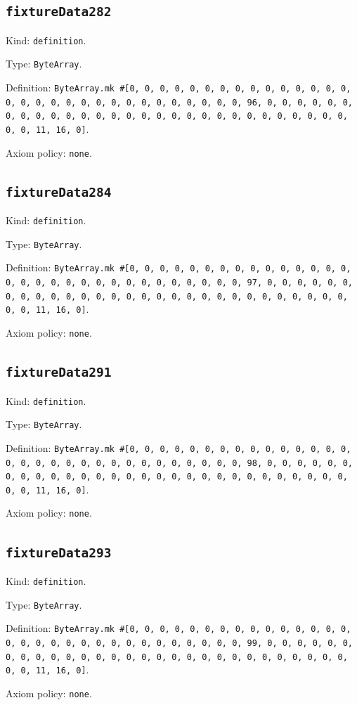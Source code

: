 \documentclass[11pt]{article}
\begin{document}
\subsection*{\texttt{fixtureData282}}
\noindent Kind: \texttt{definition}.\par
\noindent Type: \texttt{ByteArray}.\par
\noindent Definition: \texttt{ByteArray.mk \#[0, 0, 0, 0, 0, 0, 0, 0, 0, 0, 0, 0, 0, 0, 0, 0, 0, 0, 0, 0, 0, 0, 0, 0, 0, 0, 0, 0, 0, 0, 0, 96, 0, 0, 0, 0, 0, 0, 0, 0, 0, 0, 0, 0, 0, 0, 0, 0, 0, 0, 0, 0, 0, 0, 0, 0, 0, 0, 0, 0, 0, 0, 0, 11, 16, 0]}.\par
\noindent Axiom policy: \texttt{none}.\par
\subsection*{\texttt{fixtureData284}}
\noindent Kind: \texttt{definition}.\par
\noindent Type: \texttt{ByteArray}.\par
\noindent Definition: \texttt{ByteArray.mk \#[0, 0, 0, 0, 0, 0, 0, 0, 0, 0, 0, 0, 0, 0, 0, 0, 0, 0, 0, 0, 0, 0, 0, 0, 0, 0, 0, 0, 0, 0, 0, 97, 0, 0, 0, 0, 0, 0, 0, 0, 0, 0, 0, 0, 0, 0, 0, 0, 0, 0, 0, 0, 0, 0, 0, 0, 0, 0, 0, 0, 0, 0, 0, 11, 16, 0]}.\par
\noindent Axiom policy: \texttt{none}.\par
\subsection*{\texttt{fixtureData291}}
\noindent Kind: \texttt{definition}.\par
\noindent Type: \texttt{ByteArray}.\par
\noindent Definition: \texttt{ByteArray.mk \#[0, 0, 0, 0, 0, 0, 0, 0, 0, 0, 0, 0, 0, 0, 0, 0, 0, 0, 0, 0, 0, 0, 0, 0, 0, 0, 0, 0, 0, 0, 0, 98, 0, 0, 0, 0, 0, 0, 0, 0, 0, 0, 0, 0, 0, 0, 0, 0, 0, 0, 0, 0, 0, 0, 0, 0, 0, 0, 0, 0, 0, 0, 0, 11, 16, 0]}.\par
\noindent Axiom policy: \texttt{none}.\par
\subsection*{\texttt{fixtureData293}}
\noindent Kind: \texttt{definition}.\par
\noindent Type: \texttt{ByteArray}.\par
\noindent Definition: \texttt{ByteArray.mk \#[0, 0, 0, 0, 0, 0, 0, 0, 0, 0, 0, 0, 0, 0, 0, 0, 0, 0, 0, 0, 0, 0, 0, 0, 0, 0, 0, 0, 0, 0, 0, 99, 0, 0, 0, 0, 0, 0, 0, 0, 0, 0, 0, 0, 0, 0, 0, 0, 0, 0, 0, 0, 0, 0, 0, 0, 0, 0, 0, 0, 0, 0, 0, 11, 16, 0]}.\par
\noindent Axiom policy: \texttt{none}.\par
\end{document}
